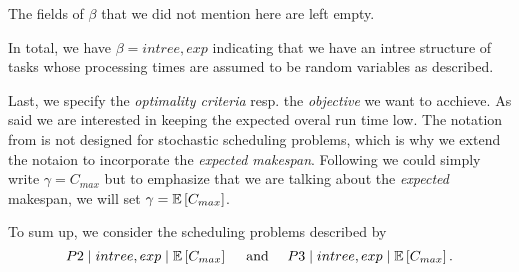 The fields of $\beta$ that we did not mention here are left empty.

In total, we have $\beta = intree, exp$ indicating that we have an intree structure of tasks whose processing times are assumed to be random variables as described.

Last, we specify the \emph{optimality criteria} resp. the \emph{objective} we want to acchieve. As said we are interested in keeping the expected overal run time low. The notation from \cite{schedulingclassification} is not designed for stochastic scheduling problems, which is why we extend the notaion to incorporate the \emph{expected makespan}. Following \cite{pinedo2008scheduling} we could simply write $\gamma = C_{max}$ but to emphasize that we are talking about the \emph{expected} makespan, we will set $\gamma = \mathbb{E}\left[ C_{max} \right]$.

To sum up, we consider the scheduling problems described by
\begin{equation*}
  P2 \mid intree, exp \mid \mathbb{E}\left[ C_{max} \right] 
  \quad \text{ and } \quad
  P3 \mid intree, exp \mid \mathbb{E}\left[ C_{max} \right]
  .
\end{equation*}



